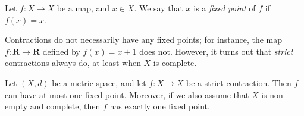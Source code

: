 \begin{definition}\label{6.6.3}
    Let \(f : X \to X\) be a map, and \(x \in X\).
    We say that \(x\) is a \emph{fixed point} of \(f\) if \(f(x) = x\).
\end{definition}

\begin{note}
    Contractions do not necessarily have any fixed points;
    for instance, the map \(f : \mathbf{R} \to \mathbf{R}\) defined by \(f(x) = x + 1\) does not.
    However, it turns out that \emph{strict} contractions always do, at least when \(X\) is complete.
\end{note}

\begin{theorem}\label{6.6.4}
    Let \((X, d)\) be a metric space, and let \(f : X \to X\) be a strict contraction.
    Then \(f\) can have at most one fixed point.
    Moreover, if we also assume that \(X\) is non-empty and complete, then \(f\) has exactly one fixed point.
\end{theorem}

